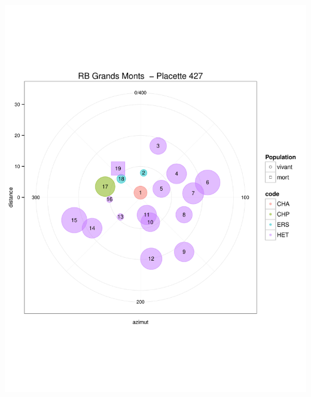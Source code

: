 \documentclass[a4paper]{book}\usepackage[]{graphicx}\usepackage[]{color}
\makeatletter
\def\maxwidth{ %
  \ifdim\Gin@nat@width>\linewidth
    \linewidth
  \else
    \Gin@nat@width
  \fi
}
\newenvironment{knitrout}{}{} %
\makeatother
\begin{document}
\begin{knitrout}
{\centering \includegraphics[width=\maxwidth]{Figures/PlanArbres-40} 

}





\end{knitrout}
\end{document}
